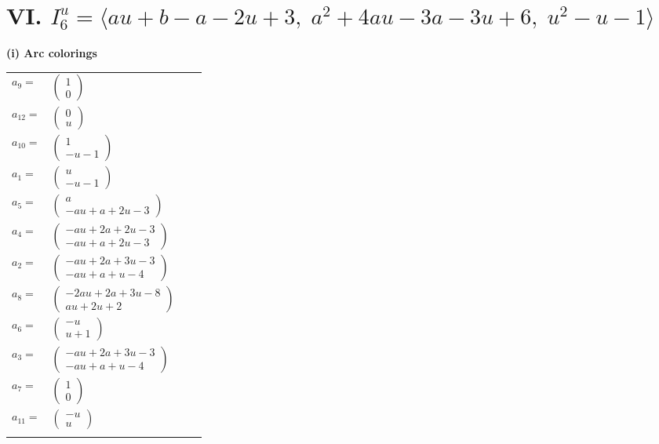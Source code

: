 \documentclass[1p]{elsarticle_modified}
\theoremstyle{definition}
\begin{document}
\centering \section*{VI. $I^u_{6}= \langle a u+b- a-2 u+3,\;a^2+4 a u-3 a-3 u+6,\;u^2- u-1 \rangle$}
\flushleft \textbf{(i) Arc colorings}\\
\begin{tabular}{m{7pt} m{180pt} m{7pt} m{180pt} }
\flushright $a_{9}=$&$\begin{pmatrix}1\\0\end{pmatrix}$ \\
\flushright $a_{12}=$&$\begin{pmatrix}0\\u\end{pmatrix}$ \\
\flushright $a_{10}=$&$\begin{pmatrix}1\\- u-1\end{pmatrix}$ \\
\flushright $a_{1}=$&$\begin{pmatrix}u\\- u-1\end{pmatrix}$ \\
\flushright $a_{5}=$&$\begin{pmatrix}a\\- a u+a+2 u-3\end{pmatrix}$ \\
\flushright $a_{4}=$&$\begin{pmatrix}- a u+2 a+2 u-3\\- a u+a+2 u-3\end{pmatrix}$ \\
\flushright $a_{2}=$&$\begin{pmatrix}- a u+2 a+3 u-3\\- a u+a+u-4\end{pmatrix}$ \\
\flushright $a_{8}=$&$\begin{pmatrix}-2 a u+2 a+3 u-8\\a u+2 u+2\end{pmatrix}$ \\
\flushright $a_{6}=$&$\begin{pmatrix}- u\\u+1\end{pmatrix}$ \\
\flushright $a_{3}=$&$\begin{pmatrix}- a u+2 a+3 u-3\\- a u+a+u-4\end{pmatrix}$ \\
\flushright $a_{7}=$&$\begin{pmatrix}1\\0\end{pmatrix}$ \\
\flushright $a_{11}=$&$\begin{pmatrix}- u\\u\end{pmatrix}$\\&\end{tabular}
\end{document}
